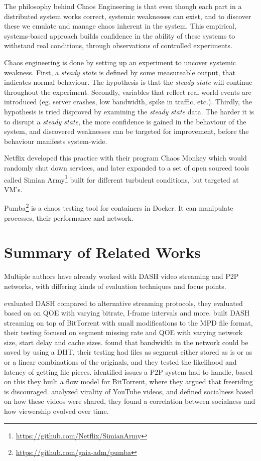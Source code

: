 The philosophy behind Chaos Engineering is that even though each part in a distributed system works correct, systemic weaknesses can exist, and to discover these we emulate and manage chaos inherent in the system. This empirical, systems-based approach builds confidence in the ability of these systems to withstand real conditions, through observations of controlled experiments.

Chaos engineering is done by setting up an experiment to uncover systemic weakness.
First, a \emph{steady state} is defined by some measureable output, that indicates normal behaviour. The hypothesis is that the \emph{steady state} will continue throughout the experiment.
Secondly, variables that reflect real world events are introduced (eg. server crashes, low bandwidth, spike in traffic, etc.).
Thirdly, the hypothesis is tried disproved by examining the \emph{steady state} data.
The harder it is to disrupt a \emph{steady state}, the more confidence is gained in the behaviour of the system, and discovered weaknesses can be targeted for improvement, before the behaviour manifests system-wide.

Netflix developed this practice with their program Chaos Monkey which would randomly shut down services, and later expanded to a set of open sourced tools called Simian Army\footnote{\url{https://github.com/Netflix/SimianArmy}} built for different turbulent conditions, but targeted at \ac{VM}'s.

Pumba\footnote{\url{https://github.com/gaia-adm/pumba}} is a chaos testing tool for containers in Docker. It can manipulate processes, their performance and network.

\section{Summary of Related Works}
Multiple authors have already worked with \ac{DASH} video streaming and \ac{P2P} networks, with differing kinds of evaluation techniques and focus points.

\citet{aloman2015performance} evaluated \ac{DASH} compared to alternative streaming protocols, they evaluated based on on \ac{QOE} with varying bitrate, I-frame intervals and more. \citet{gazdar2017toward} built \ac{DASH} streaming on top of BitTorrent with small modifications to the \ac{MPD} file format, their testing focused on segment missing rate and \ac{QOE} with varying network size, start delay and cache sizes. \citet{nguyen2009p2p} found that bandwidth in the network could be saved by using a \ac{DHT}, their testing had files as segment either stored as is or as or a linear combinations of the originals, and they tested the likelihood and latency of getting file pieces. \citet{qiu2004modeling} identified issues a \ac{P2P} system had to handle, based on this they built a flow model for BitTorrent, where they argued that freeriding is discouraged. \citet{broxton2013catching} analyzed virality of YouTube videos, and defined socialness based on how these videos were shared, they found a correlation between socialness and how viewership evolved over time.

